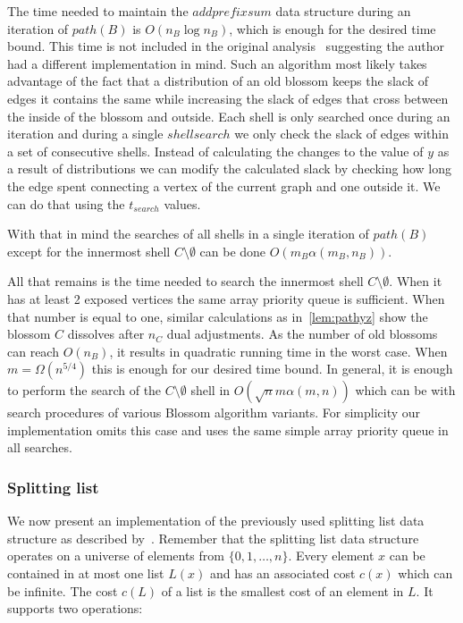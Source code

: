 The time needed to maintain the $addprefixsum$ data structure during an iteration of $path(B)$ is $O(n_B \log n_B)$, which is enough for the desired time bound. This time is not included in the original analysis~\cite{gabow1984scaling} suggesting the author had a different implementation in mind. Such an algorithm most likely takes advantage of the fact that a distribution of an old blossom keeps the slack of edges it contains the same while increasing the slack of edges that cross between the inside of the blossom and outside. Each shell is only searched once during an iteration and during a single $shellsearch$ we only check the slack of edges within a set of consecutive shells. Instead of calculating the changes to the value of $y$ as a result of distributions we can modify the calculated slack by checking how long the edge spent connecting a vertex of the current graph and one outside it. We can do that using the $t_{search}$ values. 

With that in mind the searches of all shells in a single iteration of $path(B)$ except for the innermost shell $C \setminus \emptyset$ can be done $O(m_B \alpha(m_B, n_B))$. 

All that remains is the time needed to search the innermost shell $C \setminus \emptyset$. When it has at least 2 exposed vertices the same array priority queue is sufficient. When that number is equal to one, similar calculations as in~\ref{lem:pathyz} show the blossom $C$ dissolves after $n_C$ dual adjustments. As the number of old blossoms can reach $O(n_B)$, it results in quadratic running time in the worst case. When $m = \Omega(n^{5/4})$ this is enough for our desired time bound. In general, it is enough to perform the search of the $C \setminus \emptyset$ shell in $O(\sqrt{n}m \alpha(m,n))$ which can be with search procedures of various Blossom algorithm variants. For simplicity our implementation omits this case and uses the same simple array priority queue in all searches.

\subsubsection{Splitting list}

We now present an implementation of the previously used splitting list data structure as described by~\cite{gabow1985scaling}. Remember that the splitting list data structure operates on a universe of elements from $\{0, 1, \dots, n\}$. Every element $x$ can be contained in at most one list $L(x)$ and has an associated cost $c(x)$ which can be infinite. The cost $c(L)$ of a list is the smallest cost of an element in $L$. It supports two operations:

